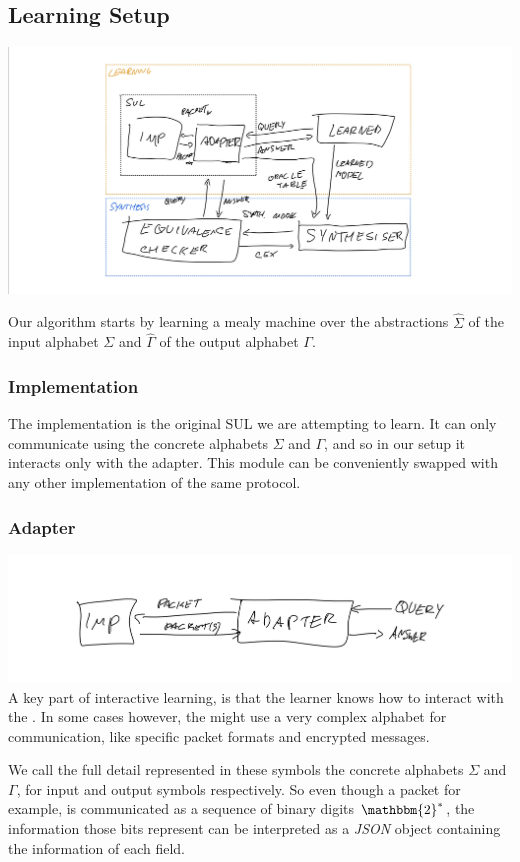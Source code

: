 \subsection{Learning Setup}
\includegraphics[width=\textwidth]{graphics/setup-drawing.jpg}

Our algorithm starts by learning a mealy machine over the abstractions $\hat\Sigma$ of the input alphabet $\Sigma$ and $\hat\Gamma$ of the output alphabet $\Gamma$.
\subsubsection{Implementation}
The implementation is the original SUL we are attempting to learn. It can only communicate using the concrete alphabets $\Sigma$ and $\Gamma$, and so in our setup it interacts only with the adapter. This module can be conveniently swapped with any other implementation of the same protocol.
\subsubsection{Adapter}

\includegraphics[width=\textwidth]{graphics/adapter-drawing.jpg}
A key part of interactive learning, is that the learner knows how to interact with the \sul. In some cases however, the \sul might use a very complex alphabet for communication, like specific packet formats and encrypted messages. 

We call the full detail represented in these symbols the concrete alphabets $\Sigma$ and $\Gamma$, for input and output symbols respectively. So even though a packet for example, is communicated as a sequence of binary digits $\mathbbm{2}^*$, the information those bits represent can be interpreted as a \textit{JSON} object containing the information of each field. 

